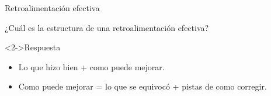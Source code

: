 \documentclass[11pt, aspectratio=169, xcolor=table,hyphens]{beamer}
\begin{document}
\begin{frame}{Retroalimentación efectiva}
	\begin{center}
		¿Cuál es la estructura de una retroalimentación efectiva?
	\end{center}
	\begin{block}<2->{Respuesta}
		\begin{itemize}[<2->]
			\item Lo que hizo bien + como puede mejorar.
			\item Como puede mejorar = lo que se equivocó + pistas de como corregir.
		\end{itemize}
		\begin{flushright}
			\cite{Heritage:2018tn}
		\end{flushright}
	\end{block}
\end{frame}


\end{document}
